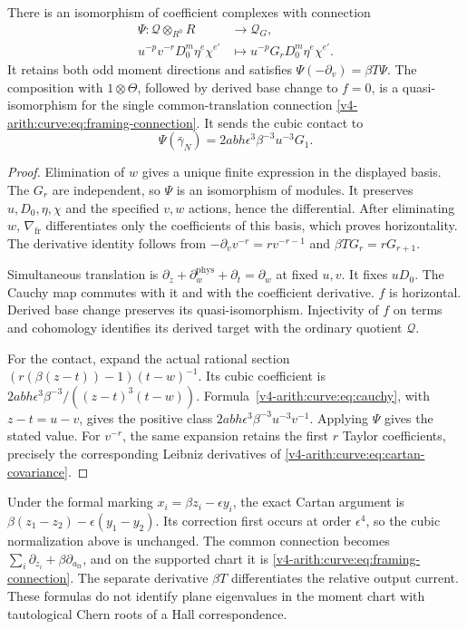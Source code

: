 \begin{theorem}\label{v4-arith:curve:thm:supported-current}
There is an isomorphism of coefficient complexes with
connection
\[
 \begin{aligned}
 \Psi:\mathcal Q\otimes_{R^0}R&\longrightarrow\mathcal Q_G,\\
 u^{-p}v^{-r}D_0^m\eta^e\chi^{e'}
       &\longmapsto u^{-p}G_rD_0^m\eta^e\chi^{e'}.
 \end{aligned}
\]
It retains both odd moment directions and satisfies
$\Psi(-\partial_v)=\beta T\Psi$.
The composition with $1\otimes\Theta$, followed by
derived base change to $f=0$, is a quasi-isomorphism
for the single common-translation connection
\eqref{v4-arith:curve:eq:framing-connection}.
It sends the cubic contact to
\[
 \Psi(\bar\gamma_N)=2abh\epsilon^3\beta^{-3}u^{-3}G_1.
\]
\end{theorem}
\begin{proof}
Elimination of $w$ gives a unique finite expression in
the displayed basis. The $G_r$ are independent, so $\Psi$ is an
isomorphism of modules. It preserves $u,D_0,\eta,\chi$
and the specified $v,w$ actions, hence the differential.
After eliminating $w$, $\nabla_{\mathrm{fr}}$ differentiates
only the coefficients of this basis, which proves
horizontality. The derivative identity follows from
$-\partial_v v^{-r}=rv^{-r-1}$ and
$\beta TG_r=rG_{r+1}$.

Simultaneous translation is
$\partial_z+\partial_w^{\mathrm{phys}}+\partial_t
=\partial_w$ at fixed $u,v$. It fixes $uD_0$.
The Cauchy map commutes with it and with the coefficient
derivative. $f$ is horizontal. Derived base change
preserves its quasi-isomorphism. Injectivity of $f$ on
terms and cohomology identifies its derived target with
the ordinary quotient $\mathcal Q$.

For the contact, expand the actual rational section
$(r(\beta(z-t))-1)(t-w)^{-1}$.
Its cubic coefficient is
$2abh\epsilon^3\beta^{-3}/((z-t)^3(t-w))$.
Formula~\eqref{v4-arith:curve:eq:cauchy}, with
$z-t=u-v$, gives the positive class
$2abh\epsilon^3\beta^{-3}u^{-3}v^{-1}$.
Applying $\Psi$ gives the stated value.
For $v^{-r}$, the same expansion retains the first
$r$ Taylor coefficients, precisely the corresponding
Leibniz derivatives of
\eqref{v4-arith:curve:eq:cartan-covariance}.
\end{proof}

Under the formal marking $x_i=\beta z_i-\epsilon y_i$,
the exact Cartan argument is
$\beta(z_1-z_2)-\epsilon(y_1-y_2)$.
Its correction first occurs at order $\epsilon^4$,
so the cubic normalization above is unchanged.
The common connection becomes
$\sum_i\partial_{z_i}+\beta\partial_{a_{\mathrm{fr}}}$,
and on the supported chart it is
\eqref{v4-arith:curve:eq:framing-connection}.
The separate derivative $\beta T$ differentiates the
relative output current.
These formulas do not identify plane eigenvalues in
the moment chart with tautological Chern roots of
a Hall correspondence.

